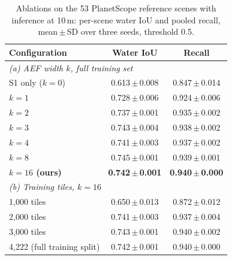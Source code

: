 \begin{table}[!t]
\centering
\caption{Ablations on the 53 PlanetScope reference scenes with inference at 10\,m: per-scene water IoU and pooled recall, mean\,$\pm$\,SD over three seeds, threshold 0.5.}
\label{tab:ablations}
\footnotesize
\begin{tabular}{lcc}
\toprule
Configuration & Water IoU & Recall \\
\midrule
\multicolumn{3}{l}{\textit{(a) AEF width $k$, full training set}} \\
S1 only ($k=0$) & 0.613\,$\pm$\,0.008 & 0.847\,$\pm$\,0.014 \\
$k=1$ & 0.728\,$\pm$\,0.006 & 0.924\,$\pm$\,0.006 \\
$k=2$ & 0.737\,$\pm$\,0.001 & 0.935\,$\pm$\,0.002 \\
$k=3$ & 0.743\,$\pm$\,0.004 & 0.938\,$\pm$\,0.002 \\
$k=4$ & 0.741\,$\pm$\,0.003 & 0.937\,$\pm$\,0.002 \\
$k=8$ & 0.745\,$\pm$\,0.001 & 0.939\,$\pm$\,0.001 \\
\textbf{$k=16$ (ours)} & \textbf{0.742\,$\pm$\,0.001} & \textbf{0.940\,$\pm$\,0.000} \\
\midrule
\multicolumn{3}{l}{\textit{(b) Training tiles, $k=16$}} \\
1{,}000 tiles & 0.650\,$\pm$\,0.013 & 0.872\,$\pm$\,0.012 \\
2{,}000 tiles & 0.741\,$\pm$\,0.003 & 0.937\,$\pm$\,0.004 \\
3{,}000 tiles & 0.743\,$\pm$\,0.001 & 0.940\,$\pm$\,0.002 \\
4{,}222 (full training split) & 0.742\,$\pm$\,0.001 & 0.940\,$\pm$\,0.000 \\
\bottomrule
\end{tabular}
\end{table}
